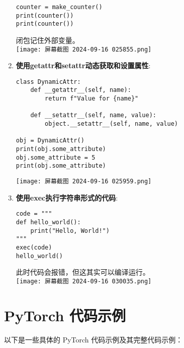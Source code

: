 \documentclass{ctexart}
\begin{document}
\begin{enumerate}[label=\arabic*.]
\begin{lstlisting}
counter = make_counter()
print(counter())
print(counter())
\end{lstlisting}
闭包记住外部变量。\\
\texttt{[image: 屏幕截图 2024-09-16 025855.png]}
\item \textbf{使用getattr和setattr动态获取和设置属性}:
\begin{lstlisting}
class DynamicAttr:
    def __getattr__(self, name):
        return f"Value for {name}"

    def __setattr__(self, name, value):
        object.__setattr__(self, name, value)

obj = DynamicAttr()
print(obj.some_attribute)  
obj.some_attribute = 5
print(obj.some_attribute)  
\end{lstlisting}
\texttt{[image: 屏幕截图 2024-09-16 025959.png]}
\item \textbf{使用exec执行字符串形式的代码}:
\begin{lstlisting}
code = """
def hello_world():
    print("Hello, World!")
"""
exec(code)
hello_world()
\end{lstlisting}
此时代码会报错，但这其实可以编译运行。\\
\texttt{[image: 屏幕截图 2024-09-16 030035.png]}
\end{enumerate}

\section{PyTorch 代码示例}

以下是一些具体的 PyTorch 代码示例及其完整代码示例：
\end{document}
